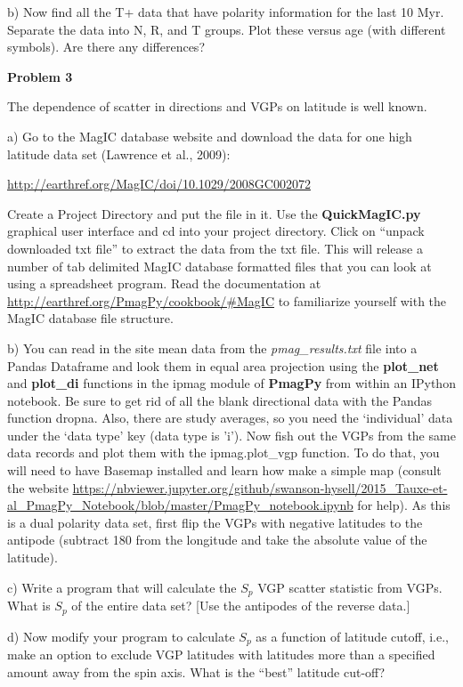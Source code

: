 {b) Now find all the T+ data that have polarity information for the last 10 Myr.  Separate the data into N, R, and T groups.   Plot these versus age (with different symbols).  Are there any differences?  

{\bf Problem 3}

The dependence of scatter in directions and VGPs on latitude is well known. 

a) Go to the MagIC database website and download the data for one high latitude data set (Lawrence et al., 2009):  \nocite{lawrence08}

 \url{http://earthref.org/MagIC/doi/10.1029/2008GC002072}	

Create a Project Directory and put the file in it.     Use the {\bf QuickMagIC.py} graphical user interface  and cd into your project directory.  Click on ``unpack downloaded txt file'' to extract the data from the txt file.  This will release a number of tab delimited MagIC database formatted files that you can look at using a spreadsheet program.   Read the  documentation at  \url{http://earthref.org/PmagPy/cookbook/#MagIC}  to familiarize yourself with the MagIC database file structure. 

b)  You can read in the site mean data from the {\it pmag\_results.txt} file into a Pandas Dataframe and look them in equal area projection using the {\bf plot\_net} and {\bf plot\_di} functions in the ipmag module of {\bf PmagPy} from within an IPython notebook.   Be sure to get rid of all the blank directional data with the Pandas function dropna. Also, there are study averages, so you need the `individual'  data under the `data type' key (data type is 'i').    Now fish out the VGPs from the same data records and plot them with the ipmag.plot\_vgp function.  To do that, you will need to have Basemap installed and learn how make a simple map (consult the website \url{https://nbviewer.jupyter.org/github/swanson-hysell/2015_Tauxe-et-al_PmagPy_Notebook/blob/master/PmagPy_notebook.ipynb} for help).     As this is a dual polarity data set, first flip the VGPs with negative latitudes to the antipode (subtract 180 from the longitude and take the absolute value of the latitude).  


c)  Write a program that will calculate the $S_p$ VGP scatter statistic from VGPs.   What is $S_p$ of the entire data set?  [Use the antipodes of the reverse data.]  

d)  Now modify your program to calculate $S_p$ as a function of  latitude cutoff, i.e., make an option to exclude VGP latitudes with latitudes more than a specified amount away from the spin axis.    What is the ``best'' latitude cut-off?  

}
